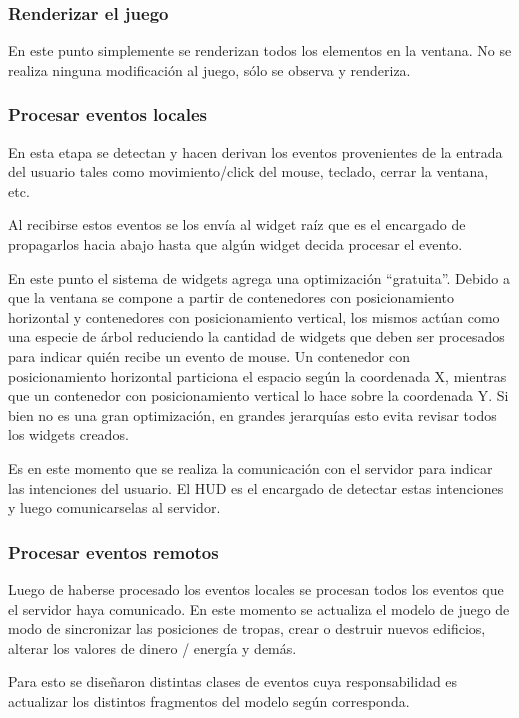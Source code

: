 \documentclass[titlepage,a4paper,12pt]{article}
\begin{document}
\subsubsection{Renderizar el juego}
En este punto simplemente se renderizan todos los elementos en la ventana. No se realiza ninguna modificación al juego, sólo se observa y renderiza.

\subsubsection{Procesar eventos locales}
En esta etapa se detectan y hacen derivan los eventos provenientes de la entrada del usuario tales como movimiento/click del mouse, teclado, cerrar la ventana, etc.

Al recibirse estos eventos se los envía al widget raíz que es el encargado de propagarlos hacia abajo hasta que algún widget decida procesar el evento.

En este punto el sistema de widgets agrega una optimización ``gratuita''. Debido a que la ventana se compone a partir de contenedores con posicionamiento horizontal y contenedores con posicionamiento vertical, los mismos actúan como una especie de árbol reduciendo la cantidad de widgets que deben ser procesados para indicar quién recibe un evento de mouse. 
Un contenedor con posicionamiento horizontal particiona el espacio según la coordenada X, mientras que un contenedor con posicionamiento vertical lo hace sobre la coordenada Y. Si bien no es una gran optimización, en grandes jerarquías esto evita revisar todos los widgets creados.

Es en este momento que se realiza la comunicación con el servidor para indicar las intenciones del usuario. El HUD es el encargado de detectar estas intenciones y luego comunicarselas al servidor.

\subsubsection{Procesar eventos remotos}
Luego de haberse procesado los eventos locales se procesan todos los eventos que el servidor haya comunicado. En este momento se actualiza el modelo de juego de modo de sincronizar las posiciones de tropas, crear o destruir nuevos edificios, alterar los valores de dinero / energía y demás.

Para esto se diseñaron distintas clases de eventos cuya responsabilidad es actualizar los distintos fragmentos del modelo según corresponda.
\end{document}
